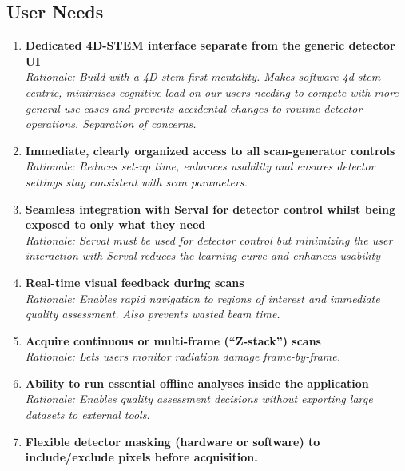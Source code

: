 \documentclass[12pt]{article}
\begin{document}
\subsection{User Needs}
\begin{enumerate}
  \item \textbf{Dedicated 4D-STEM interface separate from the generic detector UI}\\
        \textit{Rationale: Build with a 4D-stem first mentality. Makes software 4d-stem centric, minimises cognitive load on our users needing to compete with more general use cases and prevents accidental changes to routine detector operations. Separation of concerns.}
  \item \textbf{Immediate, clearly organized access to all scan-generator controls}\\
        \textit{Rationale: Reduces set-up time, enhances usability and ensures detector settings stay consistent with scan parameters.}
  \item \textbf{Seamless integration with Serval for detector control whilst being exposed to only what they need}\\
        \textit{Rationale: Serval must be used for detector control but minimizing the user interaction with Serval reduces the learning curve and enhances usability}
  \item \textbf{Real-time visual feedback during scans}\\
        \textit{Rationale: Enables rapid navigation to regions of interest and immediate quality assessment. Also prevents wasted beam time.}
  \item \textbf{Acquire continuous or multi-frame (“Z-stack”) scans}\\
        \textit{Rationale: Lets users monitor radiation damage frame-by-frame.}
  \item \textbf{Ability to run essential offline analyses inside the application}\\
        \textit{Rationale: Enables quality assessment decisions without exporting large datasets to external tools.}
  \item \textbf{Flexible detector masking (hardware or software) to include/exclude pixels before acquisition.}\\

\end{enumerate}
\end{document}
